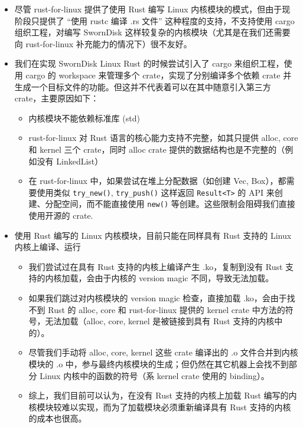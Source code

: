 \begin{itemize}
  \item 尽管 rust-for-linux 提供了使用 Rust 编写 Linux 内核模块的模式，但由于现阶段只提供了 “使用 rustc 编译 .rs 文件” 这种程度的支持，不支持使用 cargo 组织工程，对编写 SwornDisk 这样较复杂的内核模块（尤其是在我们还需要向 rust-for-linux 补充能力的情况下）很不友好。
  \item 我们在实现 SwornDisk Linux Rust 的时候尝试引入了 cargo 来组织工程，使用 cargo 的 workspace 来管理多个 crate，实现了分别编译多个依赖 crate 并生成一个目标文件的功能。但这并不代表着可以在其中随意引入第三方 crate，主要原因如下：
  \begin{itemize}
    \item 内核模块不能依赖标准库 (std)
    \item rust-for-linux 对 Rust 语言的核心能力支持不完整，如其只提供 alloc, core 和 kernel 三个 crate，同时 alloc crate 提供的数据结构也是不完整的（例如没有 LinkedList）
    \item 在 rust-for-linux 中，如果尝试在堆上分配数据（如创建 Vec, Box），都需要使用类似 \texttt{try_new()}, \texttt{try_push()} 这样返回 \texttt{Result<T>} 的 API 来创建、分配空间，而不能直接使用 \texttt{new()} 等创建。这些限制会阻碍我们直接使用开源的 crate.
  \end{itemize}
  \item 使用 Rust 编写的 Linux 内核模块，目前只能在同样具有 Rust 支持的 Linux 内核上编译、运行
  \begin{itemize}
    \item 我们尝试过在具有 Rust 支持的内核上编译产生 .ko，复制到没有 Rust 支持的内核加载，会由于内核的 version magic 不同，导致无法加载。
    \item 如果我们跳过对内核模块的 version magic 检查，直接加载 .ko，会由于找不到 Rust 的 alloc, core 和 rust-for-linux 提供的 kernel crate 中方法的符号，无法加载（alloc, core, kernel 是被链接到具有 Rust 支持的内核中的）。
    \item 尽管我们手动将 alloc, core, kernel 这些 crate 编译出的 .o 文件合并到内核模块的 .o 中，参与最终内核模块的生成；但仍然在其它机器上会找不到部分 Linux 内核中的函数的符号（系 kernel crate 使用的 binding）。
    \item 综上，我们目前可以认为，在没有 Rust 支持的内核上加载 Rust 编写的内核模块较难以实现，而为了加载模块必须重新编译具有 Rust 支持的内核的成本也很高。
  \end{itemize}
\end{itemize}